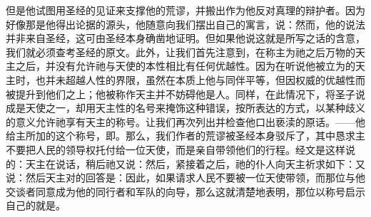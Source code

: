 但是他试图用圣经的见证来支撑他的荒谬，并搬出作为他反对真理的辩护者。因为好像那是他得出论据的源头，他随意向我们摆出自己的寓言，说：然而，他的说法并非来自圣经，这可由圣经本身确凿地证明。但如果他说这就是所写之话的含意，我们就必须查考圣经的原文。此外，让我们首先注意到，在称主为祂之后万物的天主之后，并没有允许祂与天使的本性相比有任何优越性。因为在听说他被立为的天主时，也并未超越人性的界限，虽然在本质上他与同伴平等，但因权威的优越性而被提升到他们之上；他被称作天主并不妨碍他是人。同样，在此情况下，将圣子说成是天使之一，却用天主性的名号来掩饰这种错误，按所表达的方式，以某种歧义的意义允许祂享有天主的称号。让我们再次列出并检查他口出亵渎的原话。——他给主所加的这个称号，即。那么，我们作者的荒谬被圣经本身驳斥了，其中恳求主不要把人民的领导权托付给一位天使，而是亲自带领他们的行程。经文是这样说的：天主在说话，稍后祂又说：然后，紧接着之后，祂的仆人向天主祈求如下：又说：然后天主对的回答是：因此，如果请求人民不要被一位天使带领，而那位与他交谈者同意成为他的同行者和军队的向导，那么这就清楚地表明，那位以称号启示自己的就是。\par

